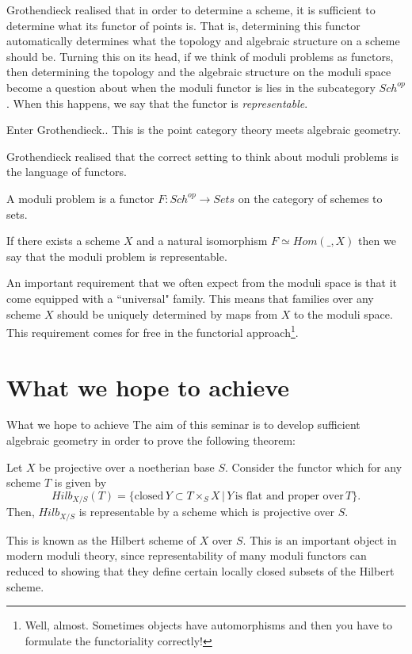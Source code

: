 \documentclass[ignorenonframetext]{beamer}
\theoremstyle{definition}
\begin{document}
Grothendieck realised that in order to determine a scheme, it is sufficient to determine what its functor of points is. That is, determining this functor automatically determines what the topology and algebraic structure on a scheme should be. Turning this on its head, if we think of moduli problems as functors, then determining the topology and the algebraic structure on the moduli space become a question about when the moduli functor is lies in the subcategory $Sch^{op}$. When this happens, we say that the functor is \textit{representable}.

\begin{frame}{Enter Grothendieck..}
	This is the point category theory meets algebraic geometry.
	
	Grothendieck realised that the correct setting to think about moduli problems is the language of functors.
\begin{definition}
	A moduli problem is a functor $F: Sch^{op} \rightarrow Sets$ on the category of schemes to sets.
\end{definition}

If there exists a scheme $X$ and a natural isomorphism $F\simeq Hom(\_,X)$ then we say that the moduli problem is representable.

\end{frame}
An important requirement that we often expect from the moduli space is that it come equipped with a ``universal" family. This means that families over any scheme $X$ should be uniquely determined by maps from $X$ to the moduli space. This requirement comes for free in the functorial approach\footnote{Well, almost. Sometimes objects have automorphisms and then you have to formulate the functoriality correctly!}.


\section{What we hope to achieve}

\begin{frame}{What we hope to achieve}
The aim of this seminar is to develop sufficient algebraic geometry in order to prove the following theorem:

\begin{theorem}\label{Hilb}
	Let $X$ be projective over a noetherian base $S$. Consider the functor which for any scheme $T$ is given by
	\[Hilb_{X/S}(T)=\bigl\{\text{closed}\,Y\subset T\times_S X\, |\, Y \,\text{is flat and proper over}\, T \bigr\}.\]
	Then, $Hilb_{X/S}$ is representable by a scheme which is projective over $S$.
\end{theorem}

This is known as the Hilbert scheme of $X$ over $S$. This is an important object in modern moduli theory, since representability of many moduli functors can reduced to showing that they define certain locally closed subsets of the Hilbert scheme. 
\end{frame}
\end{document}
